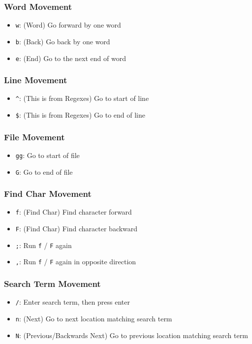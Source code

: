 \documentclass[11pt]{article}
\begin{document}
\subsubsection{Word Movement}
\label{sec:org6eae44f}
\begin{itemize}
\item \texttt{w}: (Word) Go forward by one word
\item \texttt{b}: (Back) Go back by one word
\item \texttt{e}: (End) Go to the next end of word
\end{itemize}

\subsubsection{Line Movement}
\label{sec:org29b50f4}
\begin{itemize}
\item \texttt{\textasciicircum{}}: (This is from Regexes) Go to start of line
\item \texttt{\$}: (This is from Regexes) Go to end of line
\end{itemize}
\subsubsection{File Movement}
\label{sec:orgb976ca5}
\begin{itemize}
\item \texttt{gg}: Go to start of file
\item \texttt{G}: Go to end of file
\end{itemize}

\subsubsection{Find Char Movement}
\label{sec:org7778af2}
\begin{itemize}
\item \texttt{f}: (Find Char) Find character forward
\item \texttt{F}: (Find Char) Find character backward
\item \texttt{;}: Run \texttt{f} / \texttt{F} again
\item \texttt{,}: Run \texttt{f} / \texttt{F} again in opposite direction
\end{itemize}

\subsubsection{Search Term Movement}
\label{sec:org2ab05dc}
\begin{itemize}
\item \texttt{/}: Enter search term, then press enter
\item \texttt{n}: (Next) Go to next location matching search term
\item \texttt{N}: (Previous/Backwards Next) Go to previous location matching search term
\end{itemize}
\end{document}
